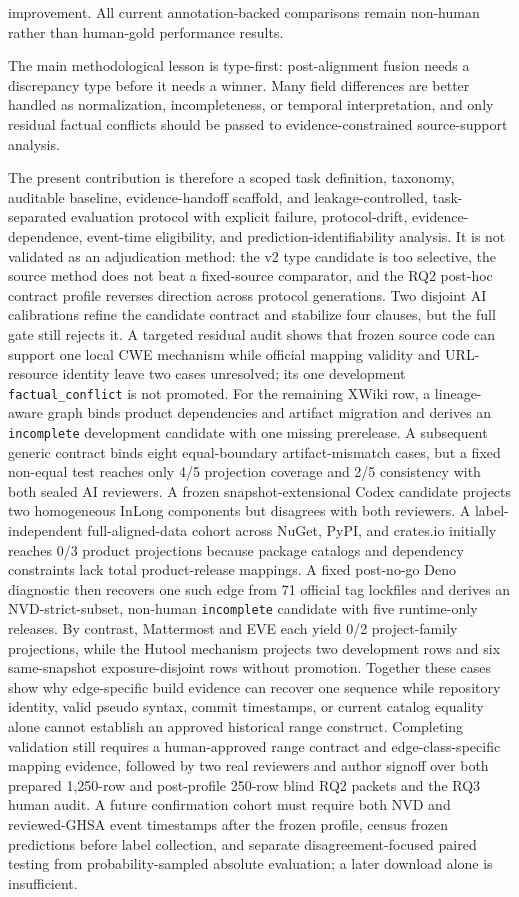 improvement. All current annotation-backed comparisons remain non-human rather than human-gold performance results.

The main methodological lesson is type-first: post-alignment fusion needs a discrepancy type before it needs a winner. Many field differences are better handled as normalization, incompleteness, or temporal interpretation, and only residual factual conflicts should be passed to evidence-constrained source-support analysis.

The present contribution is therefore a scoped task definition, taxonomy, auditable baseline, evidence-handoff scaffold, and leakage-controlled, task-separated evaluation protocol with explicit failure, protocol-drift, evidence-dependence, event-time eligibility, and prediction-identifiability analysis. It is not validated as an adjudication method: the v2 type candidate is too selective, the source method does not beat a fixed-source comparator, and the RQ2 post-hoc contract profile reverses direction across protocol generations. Two disjoint AI calibrations refine the candidate contract and stabilize four clauses, but the full gate still rejects it. A targeted residual audit shows that frozen source code can support one local CWE mechanism while official mapping validity and URL-resource identity leave two cases unresolved; its one development \texttt{factual\_conflict} is not promoted. For the remaining XWiki row, a lineage-aware graph binds product dependencies and artifact migration and derives an \texttt{incomplete} development candidate with one missing prerelease. A subsequent generic contract binds eight equal-boundary artifact-mismatch cases, but a fixed non-equal test reaches only 4/5 projection coverage and 2/5 consistency with both sealed AI reviewers. A frozen snapshot-extensional Codex candidate projects two homogeneous InLong components but disagrees with both reviewers. A label-independent full-aligned-data cohort across NuGet, PyPI, and crates.io initially reaches 0/3 product projections because package catalogs and dependency constraints lack total product-release mappings. A fixed post-no-go Deno diagnostic then recovers one such edge from 71 official tag lockfiles and derives an NVD-strict-subset, non-human \texttt{incomplete} candidate with five runtime-only releases. By contrast, Mattermost and EVE each yield 0/2 project-family projections, while the Hutool mechanism projects two development rows and six same-snapshot exposure-disjoint rows without promotion. Together these cases show why edge-specific build evidence can recover one sequence while repository identity, valid pseudo syntax, commit timestamps, or current catalog equality alone cannot establish an approved historical range construct. Completing validation still requires a human-approved range contract and edge-class-specific mapping evidence, followed by two real reviewers and author signoff over both prepared 1,250-row and post-profile 250-row blind RQ2 packets and the RQ3 human audit. A future confirmation cohort must require both NVD and reviewed-GHSA event timestamps after the frozen profile, census frozen predictions before label collection, and separate disagreement-focused paired testing from probability-sampled absolute evaluation; a later download alone is insufficient.
